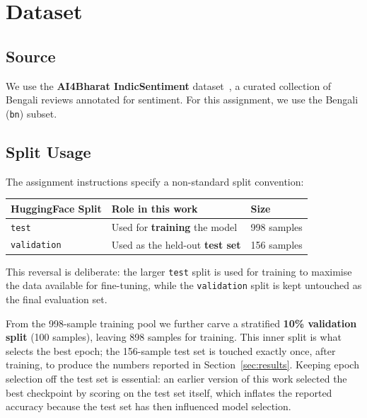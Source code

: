 \documentclass[11pt,a4paper]{article}
\begin{document}
\section{Dataset}

\subsection{Source}

We use the \textbf{AI4Bharat IndicSentiment} dataset~\cite{indicsentiment}, a curated collection of Bengali reviews annotated for sentiment. For this assignment, we use the Bengali (\texttt{bn}) subset.

\subsection{Split Usage}

The assignment instructions specify a non-standard split convention:
\begin{center}
\begin{tabular}{lll}
\toprule
\textbf{HuggingFace Split} & \textbf{Role in this work} & \textbf{Size} \\
\midrule
\texttt{test}       & Used for \textbf{training} the model & 998 samples \\
\texttt{validation} & Used as the held-out \textbf{test set} & 156 samples \\
\bottomrule
\end{tabular}
\end{center}

This reversal is deliberate: the larger \texttt{test} split is used for training to maximise the data available for fine-tuning, while the \texttt{validation} split is kept untouched as the final evaluation set.

From the 998-sample training pool we further carve a stratified \textbf{10\% validation split} (100 samples), leaving 898 samples for training. This inner split is what selects the best epoch; the 156-sample test set is touched exactly once, after training, to produce the numbers reported in Section~\ref{sec:results}. Keeping epoch selection off the test set is essential: an earlier version of this work selected the best checkpoint by scoring on the test set itself, which inflates the reported accuracy because the test set has then influenced model selection.
\end{document}
